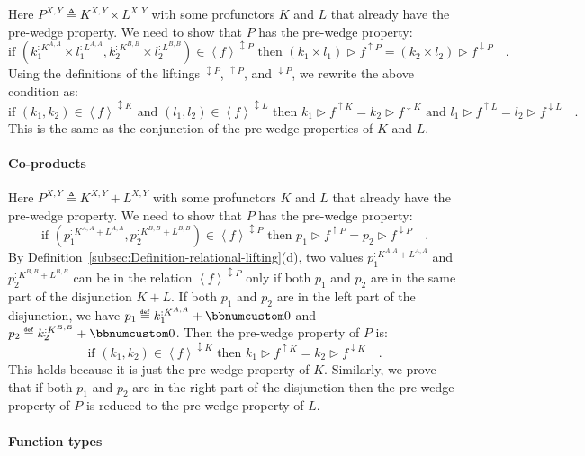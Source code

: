 Here $P^{X,Y}\triangleq K^{X,Y}\times L^{X,Y}$ with some profunctors
$K$ and $L$ that already have the pre-wedge property. We need to
show that $P$ has the pre-wedge property:
\[
\text{if }(k_{1}^{:K^{A,A}}\times l_{1}^{:L^{A,A}},k_{2}^{:K^{B,B}}\times l_{2}^{:L^{B,B}})\in\left<f\right>^{\updownarrow P}\text{ then }(k_{1}\times l_{1})\triangleright f^{\uparrow P}=(k_{2}\times l_{2})\triangleright f^{\downarrow P}\quad.
\]
Using the definitions of the liftings $^{\updownarrow P}$, $^{\uparrow P}$,
and $^{\downarrow P}$, we rewrite the above condition as:
\[
\text{if }(k_{1},k_{2})\in\left<f\right>^{\updownarrow K}\text{ and }(l_{1},l_{2})\in\left<f\right>^{\updownarrow L}\text{ then }k_{1}\triangleright f^{\uparrow K}=k_{2}\triangleright f^{\downarrow K}\text{ and }l_{1}\triangleright f^{\uparrow L}=l_{2}\triangleright f^{\downarrow L}\quad.
\]
This is the same as the conjunction of the pre-wedge properties of
$K$ and $L$.

\paragraph{Co-products}

Here $P^{X,Y}\triangleq K^{X,Y}+L^{X,Y}$ with some profunctors $K$
and $L$ that already have the pre-wedge property. We need to show
that $P$ has the pre-wedge property:
\[
\text{if }(p_{1}^{:K^{A,A}+L^{A,A}},p_{2}^{:K^{B,B}+L^{B,B}})\in\left<f\right>^{\updownarrow P}\text{ then }p_{1}\triangleright f^{\uparrow P}=p_{2}\triangleright f^{\downarrow P}\quad.
\]
By Definition~\ref{subsec:Definition-relational-lifting}(d), two
values $p_{1}^{:K^{A,A}+L^{A,A}}$ and $p_{2}^{:K^{B,B}+L^{B,B}}$
can be in the relation $\left<f\right>^{\updownarrow P}$ only if
both $p_{1}$ and $p_{2}$ are in the same part of the disjunction
$K+L$. If both $p_{1}$ and $p_{2}$ are in the left part of the
disjunction, we have $p_{1}\triangleq k_{1}^{:K^{A,A}}+\bbnum 0$
and $p_{2}\triangleq k_{2}^{:K^{B,B}}+\bbnum 0$. Then the pre-wedge
property of $P$ is:
\[
\text{if }(k_{1},k_{2})\in\left<f\right>^{\updownarrow K}\text{ then }k_{1}\triangleright f^{\uparrow K}=k_{2}\triangleright f^{\downarrow K}\quad.
\]
This holds because it is just the pre-wedge property of $K$. Similarly,
we prove that if both $p_{1}$ and $p_{2}$ are in the right part
of the disjunction then the pre-wedge property of $P$ is reduced
to the pre-wedge property of $L$.

\paragraph{Function types}

